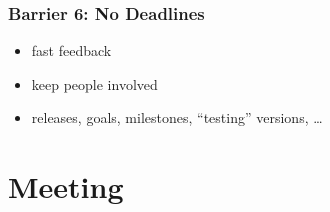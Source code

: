 \begin{frame}
	\frametitle{Barrier 6: No Deadlines}

	\begin{itemize}[<+-| alert@+>]
	\item fast feedback
	\item keep people involved
	\item releases, goals, milestones, ``testing'' versions, \dots
	\end{itemize}
\end{frame}



\section{Meeting}

